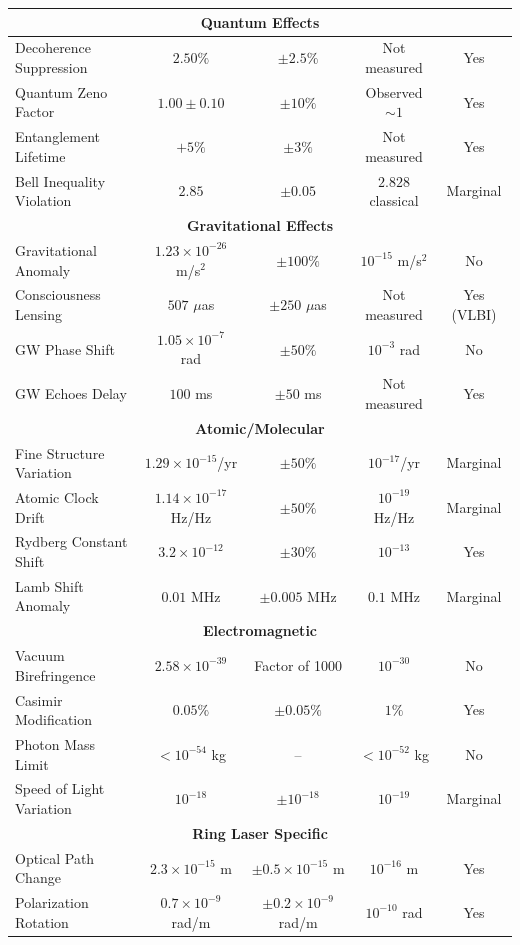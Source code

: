 \documentclass[11pt]{article}
\theoremstyle{definition}
\begin{document}
\begin{center}
\begin{longtable}{|l|c|c|c|c|}
\multicolumn{5}{|c|}{\textbf{Quantum Effects}} \\
\hline
Decoherence Suppression & $2.50\%$ & $\pm 2.5\%$ & Not measured & Yes \\
Quantum Zeno Factor & $1.00 \pm 0.10$ & $\pm 10\%$ & Observed $\sim 1$ & Yes \\
Entanglement Lifetime & $+5\%$ & $\pm 3\%$ & Not measured & Yes \\
Bell Inequality Violation & $2.85$ & $\pm 0.05$ & $2.828$ classical & Marginal \\
\hline
\multicolumn{5}{|c|}{\textbf{Gravitational Effects}} \\
\hline
Gravitational Anomaly & $1.23 \times 10^{-26}$ m/s$^2$ & $\pm 100\%$ & $10^{-15}$ m/s$^2$ & No \\
Consciousness Lensing & $507$ $\mu$as & $\pm 250$ $\mu$as & Not measured & Yes (VLBI) \\
GW Phase Shift & $1.05 \times 10^{-7}$ rad & $\pm 50\%$ & $10^{-3}$ rad & No \\
GW Echoes Delay & $100$ ms & $\pm 50$ ms & Not measured & Yes \\
\hline
\multicolumn{5}{|c|}{\textbf{Atomic/Molecular}} \\
\hline
Fine Structure Variation & $1.29 \times 10^{-15}$/yr & $\pm 50\%$ & $10^{-17}$/yr & Marginal \\
Atomic Clock Drift & $1.14 \times 10^{-17}$ Hz/Hz & $\pm 50\%$ & $10^{-19}$ Hz/Hz & Marginal \\
Rydberg Constant Shift & $3.2 \times 10^{-12}$ & $\pm 30\%$ & $10^{-13}$ & Yes \\
Lamb Shift Anomaly & $0.01$ MHz & $\pm 0.005$ MHz & $0.1$ MHz & Marginal \\
\hline
\multicolumn{5}{|c|}{\textbf{Electromagnetic}} \\
\hline
Vacuum Birefringence & $2.58 \times 10^{-39}$ & Factor of 1000 & $10^{-30}$ & No \\
Casimir Modification & $0.05\%$ & $\pm 0.05\%$ & $1\%$ & Yes \\
Photon Mass Limit & $< 10^{-54}$ kg & -- & $< 10^{-52}$ kg & No \\
Speed of Light Variation & $10^{-18}$ & $\pm 10^{-18}$ & $10^{-19}$ & Marginal \\
\hline
\multicolumn{5}{|c|}{\textbf{Ring Laser Specific}} \\
\hline
Optical Path Change & $2.3 \times 10^{-15}$ m & $\pm 0.5 \times 10^{-15}$ m & $10^{-16}$ m & Yes \\
Polarization Rotation & $0.7 \times 10^{-9}$ rad/m & $\pm 0.2 \times 10^{-9}$ rad/m & $10^{-10}$ rad & Yes \\

\end{longtable}
\end{center}
\end{document}
